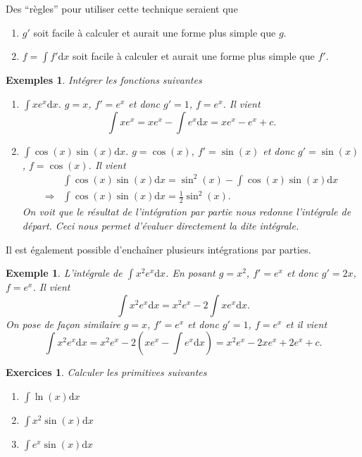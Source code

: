 \documentclass[a4paper,12pt]{book}
\newcommand{\dd}{\mathrm{d}}
\newtheorem*{exemples}{Exemples}
\newtheorem*{exemple}{Exemple}
\newtheorem*{exercices}{Exercices}
\begin{document}
Des ``règles'' pour utiliser cette technique seraient que 
\begin{enumerate}
\item $g'$ soit facile à calculer et aurait une forme plus simple que $g$.
\item $f=\int f'\dd x$ soit facile à calculer et aurait une forme plus simple que $f'$.
\end{enumerate}
\begin{exemples}
Intégrer les fonctions suivantes
 \begin{enumerate}
  \item $\int x e^x\dd x$. $g=x$, $f'=e^x$ et donc $g'=1$, $f=e^x$. Il vient
  \begin{equation}
    \int x e^x=x e^x-\int e^x\dd x=x e^x-e^x+c.
  \end{equation}
  \item $\int \cos(x)\sin(x)\dd x$. $g= \cos(x)$, $f'=\sin(x)$ et donc $g'=\sin(x)$, $f=\cos(x)$. Il vient
  \begin{align}
    &\int \cos(x)\sin(x)\dd x=\sin^2(x)-\int \cos(x)\sin(x)\dd x\nonumber\\
    \Rightarrow &\int \cos(x)\sin(x)\dd x=\frac{1}{2}\sin^2(x).
  \end{align}
  On voit que le résultat de l'intégration par partie nous redonne l'intégrale de départ. Ceci nous permet d'évaluer directement la dite intégrale.
 \end{enumerate}

\end{exemples}
Il est également possible d'enchaîner plusieurs intégrations par parties.
\begin{exemple}
L'intégrale de $\int x^2 e^x\dd x$. En posant $g=x^2$, $f'=e^x$ et donc $g'=2x$, $f=e^x$. Il vient
\begin{equation}
 \int x^2 e^x\dd x=x^2e^x-2\int x e^x\dd x.
\end{equation}
On pose de façon similaire $g=x$, $f'=e^x$ et donc $g'=1$, $f=e^x$ et il vient
\begin{equation}
\int x^2 e^x\dd x=x^2e^x-2\left(x e^x -\int e^x\dd x\right)=x^2e^x-2x e^x +2e^x+c.
\end{equation}
\end{exemple}

\begin{exercices}
Calculer les primitives suivantes
\begin{enumerate}
 \item $\int \ln(x)\dd x$
 \item $\int x^2 \sin(x)\dd x$
 \item $\int e^x\sin(x)\dd x$
\end{enumerate}

\end{exercices}
\end{document}
